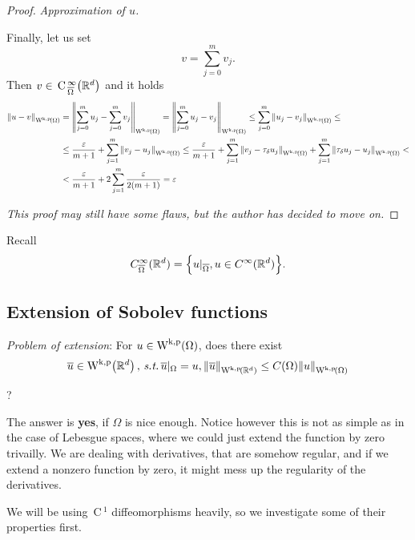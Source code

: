 \documentclass{article}
\begin{document}
\begin{proof}
\textit{Approximation of $u$.}

Finally, let us set
\[
	v = \sum_{j=0}^m v_j.
\]
Then $v \in \, \text{C} \,^{\infty}_{\overline{\Omega}}\qty({\mathbb R}^{d})$ and it holds
\begin{align*}
	\norm{u-v}_{\WkpSet{\Omega}} &= \norm{\sum_{j=0}^m u_j- \sum_{j=0}^m v_j}_{\WkpSet{\Omega}} = \norm{\sum_{j=0}^m u_j - v_j}_{\WkpSet{\Omega}} \leq \sum_{j=0}^m \norm{u_j - v_j}_{\WkpSet{\Omega}} \leq \\
	& \leq \frac{\varepsilon}{m+1} + \sum_{j=1}^m \norm{v_j-u_j}_{\WkpSet{\Omega}} \leq \frac{\varepsilon}{m+1} + \sum_{j=1}^m \norm{v_j - \tau_{\delta}u_j}_{\WkpSet{\Omega}} + \sum_{j=1}^m \norm{\tau_{\delta}u_j - u_j}_{\WkpSet{\Omega}} < \\
	&< \frac{\varepsilon}{m+1} +  2\sum_{j=1}^m \frac{\varepsilon}{2\qty(m+1)}  = \varepsilon
\end{align*}

\textit{This proof may still have some flaws, but the author has decided to move on.}
\end{proof}	

\begin{remark}
	Recall
	\[
		C^\infty_{\overline{\Omega}}({\mathbb R}^d) = \Big\{u|_{\overline{\Omega}}, u \in C^{\infty}({\mathbb R}^d) \Big\}.
	\]
\end{remark}



\subsection{Extension of Sobolev functions}
\label{sec:extension}

\textit{Problem of extension}: For $u \in \WkpSet{\Omega}$, does there exist
\[
	\overline{u} \in \WkpSet{\R^d}, \, \text{\textit{s.t.}} \,\overline{u}|_{\Omega}=u, \norm{\overline{u}}_{\WkpSet{\R^d}} \leq C(\Omega) \norm{u}_{\WkpSet{\Omega}}
\]

?

The answer is \textbf{yes}, if $\Omega$ is nice enough. Notice however this is not as simple as in the case of Lebesgue spaces, where we could just extend the function by zero trivailly. We are dealing with derivatives, that are somehow regular, and if we extend a nonzero function by zero, it might mess up the regularity of the derivatives.

We will be using $\, \text{C} \,^1$ diffeomorphisms heavily, so we investigate some of their properties first.
\end{document}

